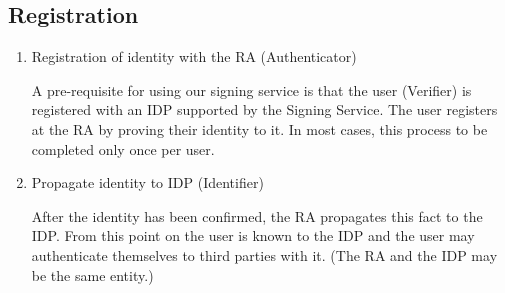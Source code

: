 \subsection{Registration}\label{subsec:registration}
\begin{enumerate}
    \item Registration of identity with the \gls{RA} (Authenticator)

    A pre-requisite for using our signing service is that the user (Verifier) is registered with an \gls{IDP} supported by the Signing Service.
    The user registers at the \gls{RA} by proving their identity to it.
    In most cases, this process to be completed only once per user.

    \item Propagate identity to \gls{IDP} (Identifier)

    After the identity has been confirmed, the \gls{RA} propagates this fact to the \gls{IDP}.
    From this point on the user is known to the \gls{IDP} and the user may authenticate themselves to third parties with it.
    (The \gls{RA} and the \gls{IDP} may be the same entity.)

\end{enumerate}

